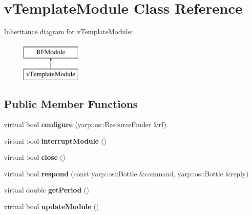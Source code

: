 \hypertarget{classvTemplateModule}{}\section{v\+Template\+Module Class Reference}
\label{classvTemplateModule}
Inheritance diagram for v\+Template\+Module\+:\begin{figure}[H]
\begin{center}
\leavevmode
\includegraphics[height=2.000000cm]{classvTemplateModule}
\end{center}
\end{figure}
\subsection*{Public Member Functions}
\begin{DoxyCompactItemize}
\item 
virtual bool {\bfseries configure} (yarp\+::os\+::\+Resource\+Finder \&rf)\hypertarget{classvTemplateModule_ac673213dfbb34f1719a8a17b5549f3ab}{}\label{classvTemplateModule_ac673213dfbb34f1719a8a17b5549f3ab}

\item 
virtual bool {\bfseries interrupt\+Module} ()\hypertarget{classvTemplateModule_a4104e88622abbd133df02af82988a167}{}\label{classvTemplateModule_a4104e88622abbd133df02af82988a167}

\item 
virtual bool {\bfseries close} ()\hypertarget{classvTemplateModule_ac94b9d709bf56efac2a9f82f393843dc}{}\label{classvTemplateModule_ac94b9d709bf56efac2a9f82f393843dc}

\item 
virtual bool {\bfseries respond} (const yarp\+::os\+::\+Bottle \&command, yarp\+::os\+::\+Bottle \&reply)\hypertarget{classvTemplateModule_aa2e6141f31e4cea8f94f0b5a1b08a934}{}\label{classvTemplateModule_aa2e6141f31e4cea8f94f0b5a1b08a934}

\item 
virtual double {\bfseries get\+Period} ()\hypertarget{classvTemplateModule_a691e4424b5de4ee43e249421a24a87cb}{}\label{classvTemplateModule_a691e4424b5de4ee43e249421a24a87cb}

\item 
virtual bool {\bfseries update\+Module} ()\hypertarget{classvTemplateModule_abd78b6b36cc849bbc34d6a3033cc4654}{}\label{classvTemplateModule_abd78b6b36cc849bbc34d6a3033cc4654}

\end{DoxyCompactItemize}


